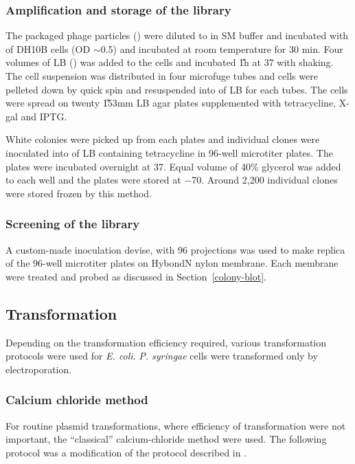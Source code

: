 \subsubsection{Amplification and storage of the library}

The packaged phage particles () were diluted to 
in SM buffer and incubated with  of  DH10B cells
(OD $\sim$0.5) and incubated at room temperature for 30
min. Four volumes of LB () was added to the cells and
incubated \U{1}{h} at 37\dg{} with shaking. The cell suspension
was distributed in four microfuge tubes and cells were pelleted
down by quick spin and resuspended into  of LB for each
tubes. The cells were spread on twenty \U{153}{mm} LB agar plates
supplemented with tetracycline, X-gal and IPTG.

White colonies were picked up from each plates and individual
clones were inoculated into  of LB containing
tetracycline in 96-well microtiter plates. The plates were
incubated overnight at 37\dg{}. Equal volume of 40\% glycerol was
added to each well and the plates were stored at $-$70\dg{}.
Around 2,200 individual clones were stored frozen by this method.

\subsubsection{Screening of the library}

A custom-made inoculation devise, with 96 projections was used to
make replica of the 96-well microtiter plates on
Hybond\texttrademark N\su{$+$} nylon membrane. Each membrane were
treated and probed as discussed in Section~\ref{colony-blot}.


\subsection{Transformation}

Depending on the transformation efficiency required, various
transformation protocols were used for \textit{E. coli}.
\textit{P. syringae} cells were transformed only by
electroporation.

\subsubsection{Calcium chloride method}

For routine plasmid transformations, where efficiency of
transformation were not important, the ``classical''
\citet{Mandel1970} calcium-chloride method were used. The
following protocol was a modification of the protocol described in
\citet{Brown1991}.

